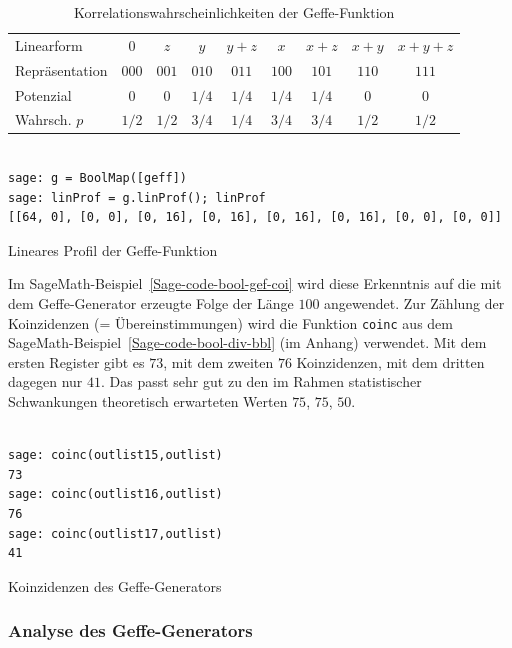 \begin{refsegment}
\begin{table}
\begin{center}
\begin{tabular}{|l|cccccccc|} \hline
  Linearform     & $0$   &   $z$   &   $y$    &   $y+z$   &  $x$    &   $x+z$   &  $x+y$  & $x+y+z$ \\
  Repräsentation & $000$ & $001$ & $010$ & $011$ & $100$ & $101$ & $110$ & $111$ \\ \hline
  Potenzial      & $0$   & $0$   & $1/4$ & $1/4$ & $1/4$ & $1/4$ & $0$   & $0$ \\
  Wahrsch. $p$   & $1/2$ & $1/2$ & $3/4$ & $1/4$ & $3/4$ & $3/4$ & $1/2$ & $1/2$ \\ \hline
\end{tabular}
\end{center}
\caption{Korrelationswahrscheinlichkeiten der Geffe-Funktion}\label{tab-bool-gef-korr}
\end{table}

\begin{sagecode}
\begin{verbatim}

sage: g = BoolMap([geff])
sage: linProf = g.linProf(); linProf
[[64, 0], [0, 0], [0, 16], [0, 16], [0, 16], [0, 16], [0, 0], [0, 0]]
\end{verbatim}
\caption{Lineares Profil der Geffe-Funktion}\label{Sage-code-bool-gef-lp}
\end{sagecode}

Im SageMath-Beispiel~\ref{Sage-code-bool-gef-coi} wird diese Erkenntnis auf
die mit dem Geffe-Generator erzeugte Folge der Länge $100$ angewendet.
Zur Zählung der Koinzidenzen (= Übereinstimmungen) wird die Funktion {\tt coinc} aus dem
SageMath-Beispiel~\ref{Sage-code-bool-div-bbl} (im Anhang) verwendet. Mit dem ersten
Register gibt es $73$, mit dem zweiten $76$ Koinzidenzen, mit dem
dritten dagegen nur $41$. Das passt sehr gut zu den im Rahmen statistischer Schwankungen
theoretisch erwarteten Werten $75$, $75$, $50$.

\begin{sagecode}
\begin{verbatim}

sage: coinc(outlist15,outlist)
73
sage: coinc(outlist16,outlist)
76
sage: coinc(outlist17,outlist)
41
\end{verbatim}
\caption{Koinzidenzen des Geffe-Generators}\label{Sage-code-bool-gef-coi}
\end{sagecode}

\subsubsection*{Analyse des Geffe-Generators}


\end{refsegment}
